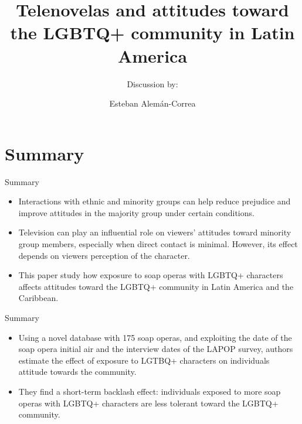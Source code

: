 \documentclass{beamer}
\title[Gulesci, Lombardi  \& Ramos (2024)]{Telenovelas and attitudes toward the LGBTQ+ community in Latin America}
\subtitle{Discussion by:}
\author[EAC]{Esteban Alemán-Correa}
\institute[SMU]
{
   Southern Methodist University
}
\date[31/01/24]{}
\begin{document}
   \begin{frame}
        \maketitle
    \end{frame}

   
    \section{Summary}
    \begin{frame}{Summary}
        \begin{itemize}
        \item  Interactions with ethnic and minority groups can help reduce prejudice and improve attitudes in the majority group under certain conditions.
                   \vspace{0.3cm} 
                   \pause 
        \item  Television can play an influential role on viewers’ attitudes toward minority group members, especially when direct contact is minimal. However, its effect depends on viewers perception of the character.
        \vspace{0.3cm} 
        \pause
        \item This paper study how exposure to soap operas with LGBTQ+ characters affects attitudes toward the LGBTQ+ community in Latin America and the Caribbean.
        \end{itemize}
    \end{frame}
    \begin{frame}{Summary}
                \begin{itemize}
              \item Using a novel database with 175 soap operas, and exploiting the date of the soap opera initial air and the interview dates of the LAPOP survey, authors estimate the effect of exposure to LGTBQ+ characters on individuals attitude towards the community.
        
            
                   \vspace{0.3cm} 
                   \pause 
            \item They find a short-term backlash effect: individuals exposed to more soap operas with LGBTQ+ characters are less tolerant toward the LGBTQ+ community.
            
            
        \end{itemize}
    \end{frame}
     
\end{document}
